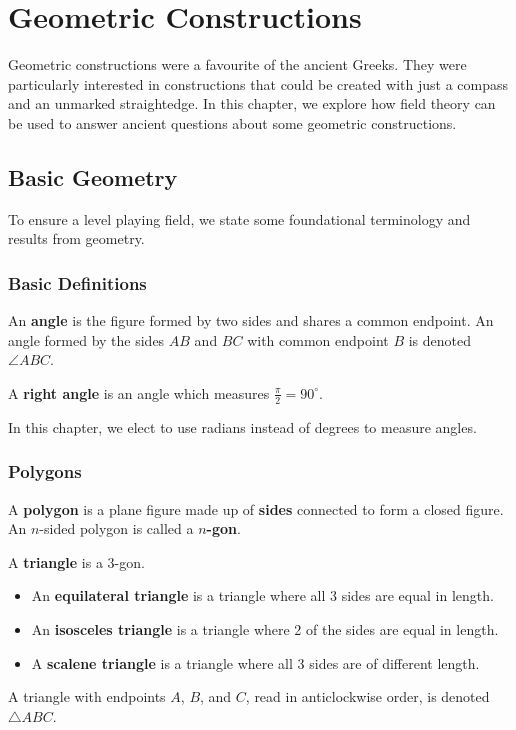 \chapter{Geometric Constructions}
Geometric constructions were a favourite of the ancient Greeks. They were particularly interested in constructions that could be created with just a compass and an unmarked straightedge. In this chapter, we explore how field theory can be used to answer ancient questions about some geometric constructions.

\section{Basic Geometry}

To ensure a level playing field, we state some foundational terminology and results from geometry.

\subsection{Basic Definitions}
\begin{definition}
    An \textbf{angle} is the figure formed by two sides and shares a common endpoint. An angle formed by the sides $AB$ and $BC$ with common endpoint $B$ is denoted $\angle ABC$.
\end{definition}

\begin{definition}
    A \textbf{right angle} is an angle which measures $\frac\pi2 = 90^\circ$.
\end{definition}

In this chapter, we elect to use radians instead of degrees to measure angles.

\subsection{Polygons}
\begin{definition}
    A \textbf{polygon} is a plane figure made up of \textbf{sides} connected to form a closed figure. An $n$-sided polygon is called a \textbf{$n$-gon}.
\end{definition}

\begin{definition}
    A \textbf{triangle} is a 3-gon.
    \begin{itemize}
        \item An \textbf{equilateral triangle} is a triangle where all 3 sides are equal in length.
        \item An \textbf{isosceles triangle} is a triangle where 2 of the sides are equal in length.
        \item A \textbf{scalene triangle} is a triangle where all 3 sides are of different length.
    \end{itemize}
    A triangle with endpoints $A$, $B$, and $C$, read in anticlockwise order, is denoted $\triangle ABC$.
\end{definition}

